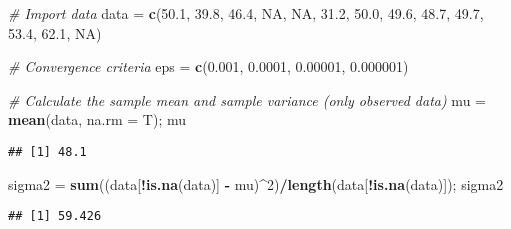 \documentclass[]{article}
\newenvironment{Shaded}{\begin{snugshade}}{\end{snugshade}}
\newcommand{\CommentTok}[1]{\textcolor[rgb]{0.56,0.35,0.01}{\textit{#1}}}
\newcommand{\DataTypeTok}[1]{\textcolor[rgb]{0.13,0.29,0.53}{#1}}
\newcommand{\DecValTok}[1]{\textcolor[rgb]{0.00,0.00,0.81}{#1}}
\newcommand{\FloatTok}[1]{\textcolor[rgb]{0.00,0.00,0.81}{#1}}
\newcommand{\KeywordTok}[1]{\textcolor[rgb]{0.13,0.29,0.53}{\textbf{#1}}}
\newcommand{\NormalTok}[1]{#1}
\newcommand{\OperatorTok}[1]{\textcolor[rgb]{0.81,0.36,0.00}{\textbf{#1}}}
\newcommand{\OtherTok}[1]{\textcolor[rgb]{0.56,0.35,0.01}{#1}}
\newcommand{\StringTok}[1]{\textcolor[rgb]{0.31,0.60,0.02}{#1}}
\begin{document}
\begin{Shaded}
\begin{Highlighting}[]
\CommentTok{# Import data}
\NormalTok{data =}\StringTok{ }\KeywordTok{c}\NormalTok{(}\FloatTok{50.1}\NormalTok{, }\FloatTok{39.8}\NormalTok{, }\FloatTok{46.4}\NormalTok{, }\OtherTok{NA}\NormalTok{, }\OtherTok{NA}\NormalTok{, }\FloatTok{31.2}\NormalTok{, }\FloatTok{50.0}\NormalTok{, }\FloatTok{49.6}\NormalTok{, }\FloatTok{48.7}\NormalTok{, }\FloatTok{49.7}\NormalTok{, }\FloatTok{53.4}\NormalTok{, }\FloatTok{62.1}\NormalTok{, }\OtherTok{NA}\NormalTok{)}

\CommentTok{# Convergence criteria}
\NormalTok{eps =}\StringTok{ }\KeywordTok{c}\NormalTok{(}\FloatTok{0.001}\NormalTok{, }\FloatTok{0.0001}\NormalTok{, }\FloatTok{0.00001}\NormalTok{, }\FloatTok{0.000001}\NormalTok{)}

\CommentTok{# Calculate the sample mean and sample variance (only observed data)}
\NormalTok{mu =}\StringTok{ }\KeywordTok{mean}\NormalTok{(data, }\DataTypeTok{na.rm =}\NormalTok{ T); mu}
\end{Highlighting}
\end{Shaded}

\begin{verbatim}
## [1] 48.1
\end{verbatim}

\begin{Shaded}
\begin{Highlighting}[]
\NormalTok{sigma2 =}\StringTok{ }\KeywordTok{sum}\NormalTok{((data[}\OperatorTok{!}\KeywordTok{is.na}\NormalTok{(data)] }\OperatorTok{-}\StringTok{ }\NormalTok{mu)}\OperatorTok{^}\DecValTok{2}\NormalTok{)}\OperatorTok{/}\KeywordTok{length}\NormalTok{(data[}\OperatorTok{!}\KeywordTok{is.na}\NormalTok{(data)]); sigma2}
\end{Highlighting}
\end{Shaded}

\begin{verbatim}
## [1] 59.426
\end{verbatim}
\end{document}
